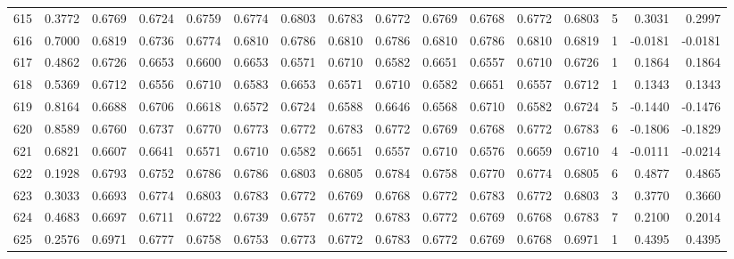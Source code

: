 \begin{tabular}{lrrrrrrrrrrrrrrr}
615 &      0.3772 &  0.6769 &  0.6724 &  0.6759 &  0.6774 &  0.6803 &  0.6783 &  0.6772 &  0.6769 &  0.6768 &   0.6772 &     0.6803 &      5 &                    0.3031 &                     0.2997 \\
616 &      0.7000 &  0.6819 &  0.6736 &  0.6774 &  0.6810 &  0.6786 &  0.6810 &  0.6786 &  0.6810 &  0.6786 &   0.6810 &     0.6819 &      1 &                   -0.0181 &                    -0.0181 \\
617 &      0.4862 &  0.6726 &  0.6653 &  0.6600 &  0.6653 &  0.6571 &  0.6710 &  0.6582 &  0.6651 &  0.6557 &   0.6710 &     0.6726 &      1 &                    0.1864 &                     0.1864 \\
618 &      0.5369 &  0.6712 &  0.6556 &  0.6710 &  0.6583 &  0.6653 &  0.6571 &  0.6710 &  0.6582 &  0.6651 &   0.6557 &     0.6712 &      1 &                    0.1343 &                     0.1343 \\
619 &      0.8164 &  0.6688 &  0.6706 &  0.6618 &  0.6572 &  0.6724 &  0.6588 &  0.6646 &  0.6568 &  0.6710 &   0.6582 &     0.6724 &      5 &                   -0.1440 &                    -0.1476 \\
620 &      0.8589 &  0.6760 &  0.6737 &  0.6770 &  0.6773 &  0.6772 &  0.6783 &  0.6772 &  0.6769 &  0.6768 &   0.6772 &     0.6783 &      6 &                   -0.1806 &                    -0.1829 \\
621 &      0.6821 &  0.6607 &  0.6641 &  0.6571 &  0.6710 &  0.6582 &  0.6651 &  0.6557 &  0.6710 &  0.6576 &   0.6659 &     0.6710 &      4 &                   -0.0111 &                    -0.0214 \\
622 &      0.1928 &  0.6793 &  0.6752 &  0.6786 &  0.6786 &  0.6803 &  0.6805 &  0.6784 &  0.6758 &  0.6770 &   0.6774 &     0.6805 &      6 &                    0.4877 &                     0.4865 \\
623 &      0.3033 &  0.6693 &  0.6774 &  0.6803 &  0.6783 &  0.6772 &  0.6769 &  0.6768 &  0.6772 &  0.6783 &   0.6772 &     0.6803 &      3 &                    0.3770 &                     0.3660 \\
624 &      0.4683 &  0.6697 &  0.6711 &  0.6722 &  0.6739 &  0.6757 &  0.6772 &  0.6783 &  0.6772 &  0.6769 &   0.6768 &     0.6783 &      7 &                    0.2100 &                     0.2014 \\
625 &      0.2576 &  0.6971 &  0.6777 &  0.6758 &  0.6753 &  0.6773 &  0.6772 &  0.6783 &  0.6772 &  0.6769 &   0.6768 &     0.6971 &      1 &                    0.4395 &                     0.4395 \\

\end{tabular}
